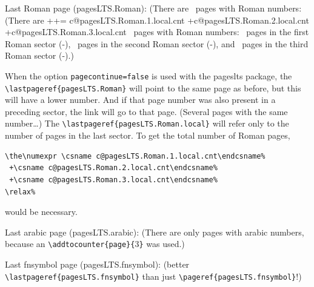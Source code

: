 \documentclass[british]{article}[2024/06/29]%
\def\pagesLTSexampleArabic{3}
\begin{document}
Last Roman page (pagesLTS.Roman): %
\makeatletter%
\ifpagesLTS@pagecontinue%
  (There are ~pages with Roman numbers:\newline
\else%
  (There are %
  ++=%
   \the\numexpr%
    \csname c@pagesLTS.Roman.1.local.cnt\endcsname%
   +\csname c@pagesLTS.Roman.2.local.cnt\endcsname%
   +\csname c@pagesLTS.Roman.3.local.cnt\endcsname%
   \relax~pages with Roman numbers:\newline
\fi%
\makeatother%
~pages in the first Roman sector
(\pageref{Roman}{\hskip3em }-),\newline
{}~pages in the second Roman sector
(\pageref{Roman2}{\hskip3em }-), and\newline
{}~pages in the third Roman sector
(\pageref{Roman3}{\hskip3em }-).)\bigskip

When the option \texttt{pagecontinue=false} is used with the
\textsf{pageslts} package, the \verb|\lastpageref{pagesLTS.Roman}| will
point to the same page as before, but this will have a lower number.
And if that page number was also present in a preceding sector,
the link will go to that page. (Several pages with the same number\ldots)\newline
The \verb|\lastpageref{pagesLTS.Roman.local}| will refer only to the number
of pages in the last sector. To get the total number of Roman pages, %
\begin{verbatim}
\the\numexpr \csname c@pagesLTS.Roman.1.local.cnt\endcsname%
 +\csname c@pagesLTS.Roman.2.local.cnt\endcsname%
 +\csname c@pagesLTS.Roman.3.local.cnt\endcsname%
\relax%
\end{verbatim}%
would be necessary.
\pagebreak

Last arabic page (pagesLTS.arabic): 
(There are only  pages with arabic numbers,
because an \verb|\addtocounter{page}{|\pagesLTSexampleArabic\verb|}| was used.)\bigskip

Last fnsymbol page (pagesLTS.fnsymbol): \newline
(better \verb|\lastpageref{pagesLTS.fnsymbol}| than just\newline
\verb|\pageref{pagesLTS.fnsymbol}|!)\bigskip
\end{document}
